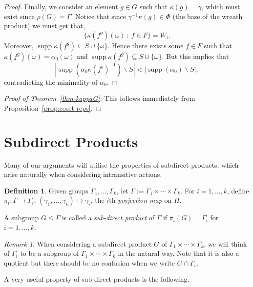 \documentclass[11pt,a4paper]{amsart}
\renewcommand{\setminus}{\smallsetminus}
\theoremstyle{definition}
\newtheorem{definition}[theorem]{Definition}
\theoremstyle{remark}
\newtheorem{remark}[theorem]{Remark}
\newcommand{\supp}{\operatorname{supp}}
\begin{document}
\begin{proof}
Finally, we consider an element $g \in G$ such that $\kappa(g) = \gamma$, which must exist since $\rho(G) = \Gamma$. Notice that since $\gamma^{-1} \kappa(g) \in \Phi$ (the base of the wreath product) we must get that, 
$$
\{ \kappa(f^g) (\omega) \ : \ f \in F \} = W_i. 
$$
Moreover, $\supp \kappa(f^g) \subseteq S \cup \{ \omega\}$. Hence there exists some $f \in F$ such that $\kappa(f^g)(\omega) = \alpha_0(\omega)$ and $\supp \kappa(f^g) \subseteq S \cup \{ \omega\}$. But this implies that 
$$
|\supp(\alpha_0 \kappa(f^g)^{-1}) \setminus S| < |\supp(\alpha_0) \setminus S|, 
$$
contradicting the minimality of $\alpha_0$.
\end{proof}

\begin{proof}[Proof of Theorem~\ref{thm-kappaG}] 
	This follows immediately from Proposition~\ref{prop:coset reps}. 
\end{proof}


\section{Subdirect Products}\label{sec:subdirect}

Many of our arguments will utilise the properties of subdirect products, which arise naturally when considering intransitive actions. 

\begin{definition}
	Given groups $\Gamma_1, \ldots, \Gamma_k$, let $\Gamma:=\Gamma_1 \times \cdots \times\Gamma_k$. For $i=1, \ldots, k$, define $\pi_i: \Gamma \to \Gamma_i$, $(\gamma_1,\ldots, \gamma_k)\mapsto \gamma_i$, the $i$th \emph{projection map} on $H$.
	
	A subgroup $G\le \Gamma$ is called a \textit{sub-direct product} of $\Gamma$ if $\pi_i(G)=\Gamma_i$ for $i=1,\ldots, k$. 
\end{definition}

\begin{remark}
	When considering a subdirect product $G$ of $\Gamma_1 \times \cdots \times\Gamma_k$, we will think of $\Gamma_i$ to be a subgroup of  $\Gamma_1 \times \cdots \times\Gamma_k$ in the natural way. Note that it is also a quotient but there should be no confusion when we write $G \cap \Gamma_i$. 
\end{remark}

A very useful property of sub-direct products is the following. 
\end{document}
